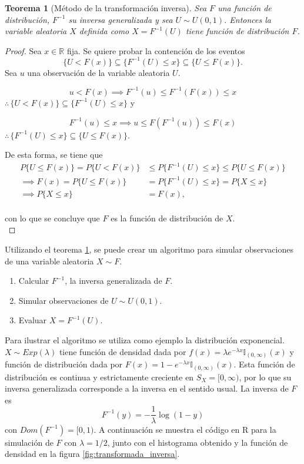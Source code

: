 \documentclass[11pt,a4paper]{article}
\newtheorem{theorem}{Teorema}[section]
\begin{document}
\begin{theorem}[Método de la transformación inversa] \label{teo:trans}
Sea $F$ una función de distribución, $F^{-1}$ su inversa generalizada y sea $U\sim U(0,1)$. Entonces la variable aleatoria $X$ definida como $X = F^{-1}(U)$ tiene función de distribución $F$.\\
\end{theorem}

\begin{proof}
Sea $x\in \mathbb{R}$ fija. Se quiere probar la contención de los eventos $$\{U<F(x)\}\subseteq\{F^{-1}(U)\leq x\}\subseteq\{U\leq F(x)\}.$$ Sea $u$ una observación de la variable aleatoria $U$.

$$u<F(x) \implies F^{-1}(u) \leq F^{-1}(F(x)) \leq x$$
$\therefore \hspace{2pt} \{U<F(x)\} \subseteq\{F^{-1}(U)\leq x\}$ y


$$F^{-1}(u)\leq x \implies u\leq F(F^{-1}(u))\leq F(x)$$
$\therefore \hspace{2pt} \{F^{-1}(U)\leq x\}\subseteq \{U \leq F(x)\}$.

De esta forma, se tiene que 
\begin{align*}
P\{U\leq F(x)\} = P\{U<F(x)\} &\leq P\{F^{-1}(U)\leq x\} \leq P\{U \leq F(x)\}\\
\implies F(x) = P\{U \leq F(x)\} &= P\{F^{-1}(U)\leq x\} = P\{X\leq x\}\\
\implies P\{X \leq x\} &= F(x),\\
\end{align*}

con lo que se concluye que $F$ es la función de distribución de $X$.\\
\end{proof}

Utilizando el teorema \ref{teo:trans}, se puede crear un algoritmo para simular observaciones de una variable aleatoria $X\sim F$.

\begin{enumerate}
\item Calcular $F^{-1}$, la inversa generalizada de $F$.
\item Simular observaciones de $U\sim U(0,1)$.
\item Evaluar $X=F^{-1}(U)$.\\ 
\end{enumerate}

Para ilustrar el algoritmo se utiliza como ejemplo la distribución exponencial. $X\sim Exp(\lambda)$ tiene función de densidad dada por $f(x) = \lambda e^{-\lambda x} \mathbb{I}_{(0,\infty)}(x)$ y función de distribución dada por $F(x) = 1-e^{-\lambda x}\mathbb{I}_{(0,\infty)}(x)$. Esta función de distribución es continua y estrictamente creciente en $S_X=[0, \infty)$, por lo que su inversa generalizada corresponde a la inversa en el sentido usual. La inversa de $F$ es $$F^{-1}(y) = -\frac{1}{\lambda}\log (1-y)$$ con $Dom(F^{-1}) = [0, 1)$. A continuación se muestra el código en R para la simulación de $F$ con $\lambda = 1/2$, junto con el histograma obtenido y la función de densidad en la figura \ref{fig:transformada_inversa}.\\
\end{document}
